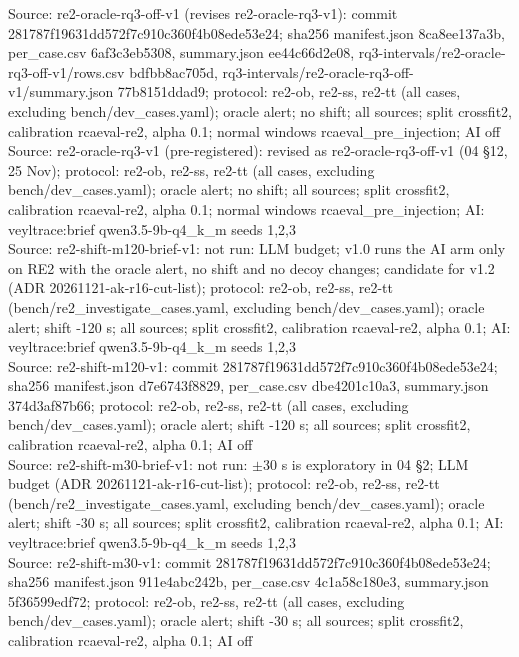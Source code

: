 \begin{table}[t]
Source: re2-oracle-rq3-off-v1 (revises re2-oracle-rq3-v1): commit 281787f19631dd572f7c910c360f4b08ede53e24; sha256 manifest.json 8ca8ee137a3b, per\_case.csv 6af3c3eb5308, summary.json ee44c66d2e08, rq3-intervals/re2-oracle-rq3-off-v1/rows.csv bdfbb8ac705d, rq3-intervals/re2-oracle-rq3-off-v1/summary.json 77b8151ddad9; protocol: re2-ob, re2-ss, re2-tt (all cases, excluding bench/dev\_cases.yaml); oracle alert; no shift; all sources; split crossfit2, calibration rcaeval-re2, alpha 0.1; normal windows rcaeval\_pre\_injection; AI off\\
Source: re2-oracle-rq3-v1 (pre-registered): revised as re2-oracle-rq3-off-v1 (04 \S{}12, 25 Nov); protocol: re2-ob, re2-ss, re2-tt (all cases, excluding bench/dev\_cases.yaml); oracle alert; no shift; all sources; split crossfit2, calibration rcaeval-re2, alpha 0.1; normal windows rcaeval\_pre\_injection; AI: veyltrace:brief qwen3.5-9b-q4\_k\_m seeds 1,2,3\\
Source: re2-shift-m120-brief-v1: not run: LLM budget; v1.0 runs the AI arm only on RE2 with the oracle alert, no shift and no decoy changes; candidate for v1.2 (ADR 20261121-ak-r16-cut-list); protocol: re2-ob, re2-ss, re2-tt (bench/re2\_investigate\_cases.yaml, excluding bench/dev\_cases.yaml); oracle alert; shift -120 s; all sources; split crossfit2, calibration rcaeval-re2, alpha 0.1; AI: veyltrace:brief qwen3.5-9b-q4\_k\_m seeds 1,2,3\\
Source: re2-shift-m120-v1: commit 281787f19631dd572f7c910c360f4b08ede53e24; sha256 manifest.json d7e6743f8829, per\_case.csv dbe4201c10a3, summary.json 374d3af87b66; protocol: re2-ob, re2-ss, re2-tt (all cases, excluding bench/dev\_cases.yaml); oracle alert; shift -120 s; all sources; split crossfit2, calibration rcaeval-re2, alpha 0.1; AI off\\
Source: re2-shift-m30-brief-v1: not run: $\pm$30 s is exploratory in 04 \S{}2; LLM budget (ADR 20261121-ak-r16-cut-list); protocol: re2-ob, re2-ss, re2-tt (bench/re2\_investigate\_cases.yaml, excluding bench/dev\_cases.yaml); oracle alert; shift -30 s; all sources; split crossfit2, calibration rcaeval-re2, alpha 0.1; AI: veyltrace:brief qwen3.5-9b-q4\_k\_m seeds 1,2,3\\
Source: re2-shift-m30-v1: commit 281787f19631dd572f7c910c360f4b08ede53e24; sha256 manifest.json 911e4abc242b, per\_case.csv 4c1a58c180e3, summary.json 5f36599edf72; protocol: re2-ob, re2-ss, re2-tt (all cases, excluding bench/dev\_cases.yaml); oracle alert; shift -30 s; all sources; split crossfit2, calibration rcaeval-re2, alpha 0.1; AI off\\

\end{table}
